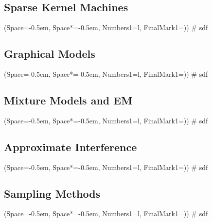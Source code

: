 \documentclass[12pt, a4paper]{article}
\newcommand{\listSpace}{-0.5em}%
\begin{document}
\subsection{Sparse Kernel Machines}
\begin{easylist}[itemize]
	\ListProperties(Space=\listSpace, Space*=\listSpace, Numbers1=l, FinalMark1={)})
	# sdf
\end{easylist}

\subsection{Graphical Models}
\begin{easylist}[itemize]
	\ListProperties(Space=\listSpace, Space*=\listSpace, Numbers1=l, FinalMark1={)})
	# sdf
\end{easylist}

\subsection{Mixture Models and EM}
\begin{easylist}[itemize]
	\ListProperties(Space=\listSpace, Space*=\listSpace, Numbers1=l, FinalMark1={)})
	# sdf
\end{easylist}

\subsection{Approximate Interference}
\begin{easylist}[itemize]
	\ListProperties(Space=\listSpace, Space*=\listSpace, Numbers1=l, FinalMark1={)})
	# sdf
\end{easylist}

\subsection{Sampling Methods}
\begin{easylist}[itemize]
	\ListProperties(Space=\listSpace, Space*=\listSpace, Numbers1=l, FinalMark1={)})
	# sdf
\end{easylist}
\end{document}
